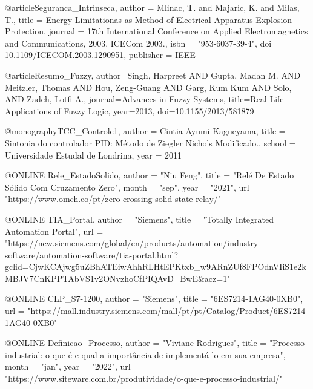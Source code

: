 @article{Seguranca_Intrinseca,
    author = {Mlinac, T. and Majaric, K. and Milas, T.}, title = {{Energy Limitationas as Method of Electrical Apparatus Explosion Protection}}, journal = {17th International Conference on Applied Electromagnetics and Communications, 2003. ICECom 2003.}, isbn = "953-6037-39-4", doi = {10.1109/ICECOM.2003.1290951}, publisher = {IEEE}}

@article{Resumo_Fuzzy,
    author={Singh, Harpreet AND Gupta, Madan M. AND Meitzler, Thomas AND Hou, Zeng-Guang AND Garg, Kum Kum AND Solo, AND Zadeh, Lotfi A.}, journal={Advances in Fuzzy Systems}, title={Real-Life Applications of Fuzzy Logic}, year={2013}, doi={10.1155/2013/581879}}

@monography{TCC_Controle1,
    author = {Cintia Ayumi Kagueyama}, title = {Sintonia do controlador PID: Método de Ziegler Nichols Modificado.}, school = {Universidade Estudal de Londrina}, year = {2011}}
    
@ONLINE {Rele_EstadoSolido, author = "Niu Feng", title  = "Relé De Estado Sólido Com Cruzamento Zero", month  = "sep", year   = "2021", url    = "https://www.omch.co/pt/zero-crossing-solid-state-relay/"}

@ONLINE {TIA_Portal, author = "Siemens", title  = "Totally Integrated Automation Portal", url = "https://new.siemens.com/global/en/products/automation/industry-software/automation-software/tia-portal.html?gclid=CjwKCAjwg5uZBhATEiwAhhRLHtEPKtxb_w9ARnZUf8FPOdnVIiS1e2kMBJV7CnKPPTAbVS1v2ONvzhoCfPIQAvD_BwE\&acz=1"}

@ONLINE {CLP_S7-1200, author = "Siemens", title  = "6ES7214-1AG40-0XB0", url = "https://mall.industry.siemens.com/mall/pt/pt/Catalog/Product/6ES7214-1AG40-0XB0"}

@ONLINE {Definicao_Processo, author = "Viviane Rodrigues", title  = "Processo industrial: o que é e qual a importância de implementá-lo em sua empresa", month  = "jan", year   = "2022", url    = "https://www.siteware.com.br/produtividade/o-que-e-processo-industrial/"}
